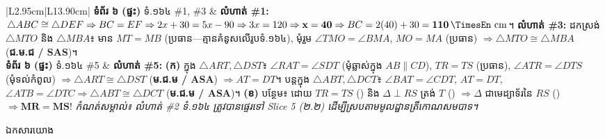\documentclass[a4paper,12pt]{article}
\newcommand{\en}[1]{{\TimesEn #1}}
\newcommand{\unit}[1]{\,\text{\en{#1}}}
\newcommand{\cnum}[1]{{\TimesEn\fontsize{10.5pt}{12pt}\selectfont\ding{\numexpr181+#1\relax}}}
\newcommand{\tri}[1]{\ensuremath{\triangle #1}}
\newcommand{\ang}[1]{\ensuremath{\angle #1}}
\newcommand{\cg}{\ensuremath{\cong}}
\newcommand{\refbanner}[1]{%
  \Needspace{2.2cm}%
  \vspace{2pt}%
  \begin{tcolorbox}[
    enhanced, sharp corners, colback=panelgray, colframe=black,
    boxrule=0.85pt, top=6pt, bottom=6pt, left=9pt, right=9pt,
    before skip=6pt, after skip=5pt
  ]
    {\muol\fontsize{12pt}{19pt}\selectfont #1}%
  \end{tcolorbox}%
}
\begin{document}
\begin{longtable}{|L{2.95cm}|L{13.90cm}|}
\hline
\textbf{ទំព័រ ៦ (ផ្ទះ)} \newline ទំ.១៦៤ \en{\#1, \#3} &
\textbf{លំហាត់ \en{\#1}:} $\tri{ABC}\cg\tri{DEF} \Rightarrow BC=EF \Rightarrow 2x+30=5x-90 \Rightarrow 3x=120 \Rightarrow \mathbf{x=40} \Rightarrow BC=2(40)+30=\mathbf{110\unit{cm}}$។ \newline
\textbf{លំហាត់ \en{\#3}:} ដកស្រង់ $\tri{MTO}$ និង $\tri{MBA}$៖ មាន $MT=MB$ (ប្រធាន\en{---}គ្មានគំនូសលើរូបទំ.១៦៤), មុំរួម $\ang{TMO}=\ang{BMA}$, $MO=MA$ (ប្រធាន) $\Rightarrow \tri{MTO}\cg\tri{MBA}$ (\textbf{ជ.ម.ជ / \en{SAS}})។ \\
\hline
\textbf{ទំព័រ ៦ (ផ្ទះ)} \newline ទំ.១៦៤ \en{\#5} &
\textbf{លំហាត់ \en{\#5}:} \textbf{(ក)} ក្នុង $\tri{ART}, \tri{DST}$៖ $\ang{RAT}=\ang{SDT}$ (មុំឆ្លាស់ក្នុង $AB\parallel CD$), $TR=TS$ (ប្រធាន), $\ang{ATR}=\ang{DTS}$ (មុំទល់កំពូល) $\Rightarrow \tri{ART}\cg\tri{DST}$ (\textbf{ម.ជ.ម / \en{ASA}}) $\Rightarrow AT=DT$។ បន្តក្នុង $\tri{ABT}, \tri{DCT}$៖ $\ang{BAT}=\ang{CDT}$, $AT=DT$, $\ang{ATB}=\ang{DTC} \Rightarrow \tri{ABT}\cg\tri{DCT}$ (\textbf{ម.ជ.ម / \en{ASA}})។ \textbf{(ខ)} បន្ថែម៖ ដោយ $TR=TS$ (\cnum{1}) និង $\Delta\perp RS$ ត្រង់ $T$ (\cnum{2}) $\Rightarrow \Delta$ ជាមេដ្យាទ័រនៃ $RS$ (\cnum{4}) $\Rightarrow \mathbf{MR=MS}$! \newline
\textit{កំណត់សម្គាល់៖ លំហាត់ \en{\#2} ទំ.១៦៤ ត្រូវបានផ្ទេរទៅ \en{Slice 5} (២.២) ដើម្បីស្របតាមមូលដ្ឋានត្រីកោណសមបាទ។} \\
\hline
\end{longtable}
\endgroup

\vspace{10pt}
\refbanner{ឯកសារយោង}
\end{document}
